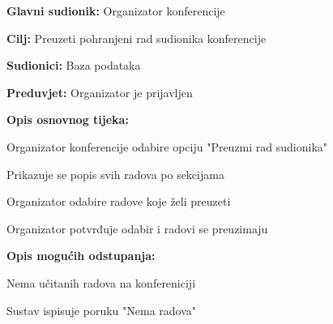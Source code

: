 	\noindent {}
	\begin{packed_item}
		
		\item \textbf{Glavni sudionik: }Organizator konferencije
		\item  \textbf{Cilj:} Preuzeti pohranjeni rad sudionika konferencije
		\item  \textbf{Sudionici:} Baza podataka
		\item  \textbf{Preduvjet:} Organizator je prijavljen
		\item  \textbf{Opis osnovnog tijeka:}
		
		\item[] \begin{packed_enum}
			
			\item Organizator konferencije odabire opciju "Preuzmi rad sudionika"
			\item Prikazuje se popis svih radova po sekcijama
			\item Organizator odabire radove koje želi preuzeti
			\item Organizator potvrđuje odabir i radovi se preuzimaju
			
		\end{packed_enum}
		
		\item  \textbf{Opis mogućih odstupanja:}
		
		\item[] \begin{packed_item}
			
			\item[2.a] Nema učitanih radova na konfereniciji
			\item[] \begin{packed_enum}
				
				\item Sustav ispisuje poruku "Nema radova"
				
			\end{packed_enum}
		\end{packed_item}
	\end{packed_item}

